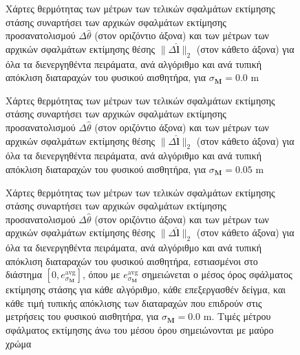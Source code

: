 \begin{figure}\vspace{1cm}\hspace{0.5cm}
  
  \vspace{1cm}
  \caption{\small Χάρτες θερμότητας των μέτρων των τελικών σφαλμάτων εκτίμησης
           στάσης συναρτήσει των αρχικών σφαλμάτων εκτίμησης προσανατολισμού
           $\Delta\hat{\theta}$ (στον οριζόντιο άξονα) και των μέτρων των
           αρχικών σφαλμάτων εκτίμησης θέσης $\|\Delta \hat{\bm{l}}\|_2$ (στον
           κάθετο άξονα) για όλα τα διενεργηθέντα πειράματα, ανά αλγόριθμο και
           ανά τυπική απόκλιση διαταραχών του φυσικού αισθητήρα, για
           $\sigma_{\bm{M}} = 0.0$ m}
  \label{fig:02_04_05:06}
\end{figure}

\begin{figure}\vspace{1cm}\hspace{0.5cm}
  
  \vspace{1cm}
  \caption{\small Χάρτες θερμότητας των μέτρων των τελικών σφαλμάτων εκτίμησης
           στάσης συναρτήσει των αρχικών σφαλμάτων εκτίμησης προσανατολισμού
           $\Delta\hat{\theta}$ (στον οριζόντιο άξονα) και των μέτρων των
           αρχικών σφαλμάτων εκτίμησης θέσης $\|\Delta \hat{\bm{l}}\|_2$ (στον
           κάθετο άξονα) για όλα τα διενεργηθέντα πειράματα, ανά αλγόριθμο και
           ανά τυπική απόκλιση διαταραχών του φυσικού αισθητήρα, για
           $\sigma_{\bm{M}} = 0.05$ m}
  \label{fig:02_04_05:07}
\end{figure}

\begin{figure}\vspace{2cm}\hspace{0.5cm}
  
  \vspace{1cm}
  \caption{\small Χάρτες θερμότητας των μέτρων των τελικών σφαλμάτων εκτίμησης
           στάσης συναρτήσει των αρχικών σφαλμάτων εκτίμησης προσανατολισμού
           $\Delta\hat{\theta}$ (στον οριζόντιο άξονα) και των μέτρων των
           αρχικών σφαλμάτων εκτίμησης θέσης $\|\Delta \hat{\bm{l}}\|_2$ (στον
           κάθετο άξονα) για όλα τα διενεργηθέντα πειράματα, ανά αλγόριθμο και
           ανά τυπική απόκλιση διαταραχών του φυσικού αισθητήρα, εστιασμένοι
           στο διάστημα $[0, e_{\sigma_{\bm{M}}}^{\text{avg}}]$, όπου με
           $e_{\sigma_{\bm{M}}}^{\text{avg}}$ σημειώνεται ο μέσος όρος
           σφάλματος εκτίμησης στάσης για κάθε αλγόριθμο, κάθε επεξεργασθέν
           δείγμα, και κάθε τιμή τυπικής απόκλισης των διαταραχών που επιδρούν
           στις μετρήσεις του φυσικού αισθητήρα, για $\sigma_{\bm{M}} = 0.0$ m.
           Τιμές μέτρου σφάλματος εκτίμησης άνω του μέσου όρου σημειώνονται με
           μαύρο χρώμα}
  \label{fig:02_04_05:08}
\end{figure}

